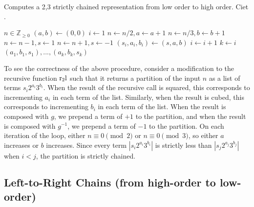 \documentclass{ucalgthes1}
\theoremstyle{definition}
\newcommand{\ZZgez}{\mathbb{Z}_{\ge 0}}
\begin{document}
\begin{algorithm}[h]
\caption{Computes a 2,3 strictly chained representation from low order to high order. Ciet \cite{Ciet2006}.}
\label{alg:rtolDbnsChain}
\begin{algorithmic}[1]
\REQUIRE $n \in \ZZgez$
\STATE $(a, b) \gets (0, 0)$
\STATE $i \gets 1$
		\STATE $n \gets n / 2, a \gets a + 1$
	\ENDWHILE
		\STATE $n \gets n / 3, b \gets b + 1$
	\ENDWHILE
		\STATE $n \gets n - 1, s \gets 1$
		\STATE $n \gets n + 1, s \gets -1$
	\ENDIF
	\STATE $(s_i, a_i, b_i) \gets (s, a, b)$
	\STATE $i \gets i + 1$
\ENDWHILE
\STATE $k \gets i$
\RETURN $(a_1, b_1, s_1), ..., (a_k, b_k, s_k)$
\end{algorithmic}
\end{algorithm}

To see the correctness of the above procedure, consider a modification to the recursive function $\textrm{r}_2\textrm{l}$ such that it returns a partition of the input $n$ as a list of terms $s_i2^{a_i}3^{b_i}$. When the result of the recursive call is squared, this corresponds to incrementing $a_i$ in each term of the list.  Similarly, when the result is cubed, this corresponds to incrementing $b_i$ in each term of the list. When the result is composed with $g$, we prepend a term of $+1$ to the partition, and when the result is composed with $g^{-1}$, we prepend a term of $-1$ to the partition. On each iteration of the loop, either $n \equiv 0 \pmod 2$ or $n \equiv 0 \pmod 3$, so either $a$ increases or $b$ increases. Since every term $|s_i2^{a_i}3^{b_i}|$ is strictly less than $|s_j2^{a_j}3^{b_j}|$ when $i < j$, the partition is strictly chained.

\bigbreak
\subsection{Left-to-Right Chains (from high-order to low-order)}
\label{subsec:ltorChains}

\newcommand{\greedyltor}{\textrm{greedy}}
\newcommand{\greedychain}{\textrm{greedy}'}
\newcommand{\greedybound}{\textrm{greedy}''}
\newcommand{\closest}{\textrm{closest}}
\end{document}
